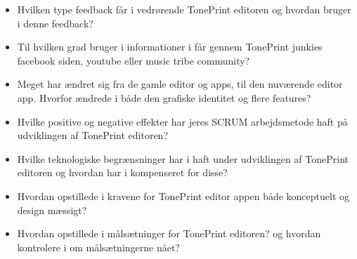 \begin{itemize}
  \item Hvilken type feedback får i vedrørende TonePrint editoren og hvordan bruger i denne feedback?
  \item Til hvilken grad bruger i informationer i får gennem TonePrint junkies facebook siden, youtube eller music tribe community? 
  \item Meget har ændret sig fra de gamle editor og apps, til den nuværende editor app. Hvorfor ændrede i både den grafiske identitet og flere features?
  \item Hvilke positive og negative effekter har jeres SCRUM arbejdsmetode haft på udviklingen af TonePrint editoren?
  \item Hvilke teknologiske begrænsninger har i haft under udviklingen af TonePrint editoren og hvordan har i kompenseret for disse?
  \item Hvordan opstillede i kravene for TonePrint editor appen både konceptuelt og design mæssigt?
  \item Hvordan opstillede i målsætninger for TonePrint editoren? og hvordan kontrolere i om målsætningerne nået?
\end{itemize}


